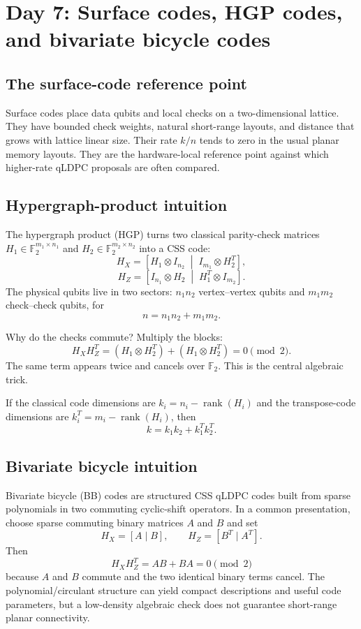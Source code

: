 \documentclass[11pt]{article}
\newcommand{\Ftwo}{\mathbb{F}_2}
\newcommand{\rank}{\operatorname{rank}}
\begin{document}
\section{Day 7: Surface codes, HGP codes, and bivariate bicycle codes}

\subsection{The surface-code reference point}

Surface codes place data qubits and local checks on a two-dimensional lattice. They have bounded
check weights, natural short-range layouts, and distance that grows with lattice linear size. Their
rate \(k/n\) tends to zero in the usual planar memory layouts. They are the hardware-local reference
point against which higher-rate qLDPC proposals are often compared.

\subsection{Hypergraph-product intuition}

The hypergraph product (HGP) turns two classical parity-check matrices
\(H_1\in\Ftwo^{m_1\times n_1}\) and \(H_2\in\Ftwo^{m_2\times n_2}\) into a CSS code:
\[
H_X=\left[H_1\otimes I_{n_2}\;\middle|\;I_{m_1}\otimes H_2^T\right],
\]
\[
H_Z=\left[I_{n_1}\otimes H_2\;\middle|\;H_1^T\otimes I_{m_2}\right].
\]
The physical qubits live in two sectors: \(n_1n_2\) vertex--vertex qubits and \(m_1m_2\)
check--check qubits, for
\[
n=n_1n_2+m_1m_2.
\]

Why do the checks commute? Multiply the blocks:
\[
H_XH_Z^T=(H_1\otimes H_2^T)+(H_1\otimes H_2^T)=0\pmod2.
\]
The same term appears twice and cancels over \(\Ftwo\). This is the central algebraic trick.

If the classical code dimensions are \(k_i=n_i-\rank(H_i)\) and the transpose-code dimensions are
\(k_i^T=m_i-\rank(H_i)\), then
\[
k=k_1k_2+k_1^Tk_2^T.
\]

\subsection{Bivariate bicycle intuition}

Bivariate bicycle (BB) codes are structured CSS qLDPC codes built from sparse polynomials in two
commuting cyclic-shift operators. In a common presentation, choose sparse commuting binary matrices
\(A\) and \(B\) and set
\[
H_X=[A\mid B],\qquad H_Z=[B^T\mid A^T].
\]
Then
\[
H_XH_Z^T=AB+BA=0\pmod2
\]
because \(A\) and \(B\) commute and the two identical binary terms cancel. The polynomial/circulant
structure can yield compact descriptions and useful code parameters, but a low-density algebraic
check does not guarantee short-range planar connectivity.
\end{document}
